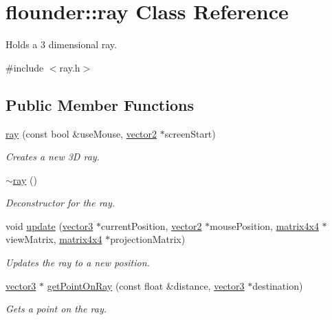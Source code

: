 \hypertarget{classflounder_1_1ray}{}\section{flounder\+:\+:ray Class Reference}
\label{classflounder_1_1ray}


Holds a 3 dimensional ray.  




{\ttfamily \#include $<$ray.\+h$>$}

\subsection*{Public Member Functions}
\begin{DoxyCompactItemize}
\item 
\hyperlink{classflounder_1_1ray_adc2baacdaf66bd982c3b48827d53d103}{ray} (const bool \&use\+Mouse, \hyperlink{classflounder_1_1vector2}{vector2} $\ast$screen\+Start)
\begin{DoxyCompactList}\small\item\em Creates a new 3D ray. \end{DoxyCompactList}\item 
\hyperlink{classflounder_1_1ray_a22e1374c250bbad557f01428b95d7fe1}{$\sim$ray} ()
\begin{DoxyCompactList}\small\item\em Deconstructor for the ray. \end{DoxyCompactList}\item 
void \hyperlink{classflounder_1_1ray_a66cad92bcca61f25755e21b1d54edb99}{update} (\hyperlink{classflounder_1_1vector3}{vector3} $\ast$current\+Position, \hyperlink{classflounder_1_1vector2}{vector2} $\ast$mouse\+Position, \hyperlink{classflounder_1_1matrix4x4}{matrix4x4} $\ast$view\+Matrix, \hyperlink{classflounder_1_1matrix4x4}{matrix4x4} $\ast$projection\+Matrix)
\begin{DoxyCompactList}\small\item\em Updates the ray to a new position. \end{DoxyCompactList}\item 
\hyperlink{classflounder_1_1vector3}{vector3} $\ast$ \hyperlink{classflounder_1_1ray_ae13e7a6d1df979371e75e7f7cfcec130}{get\+Point\+On\+Ray} (const float \&distance, \hyperlink{classflounder_1_1vector3}{vector3} $\ast$destination)
\begin{DoxyCompactList}\small\item\em Gets a point on the ray. \end{DoxyCompactList}\item 

\end{DoxyCompactItemize}
